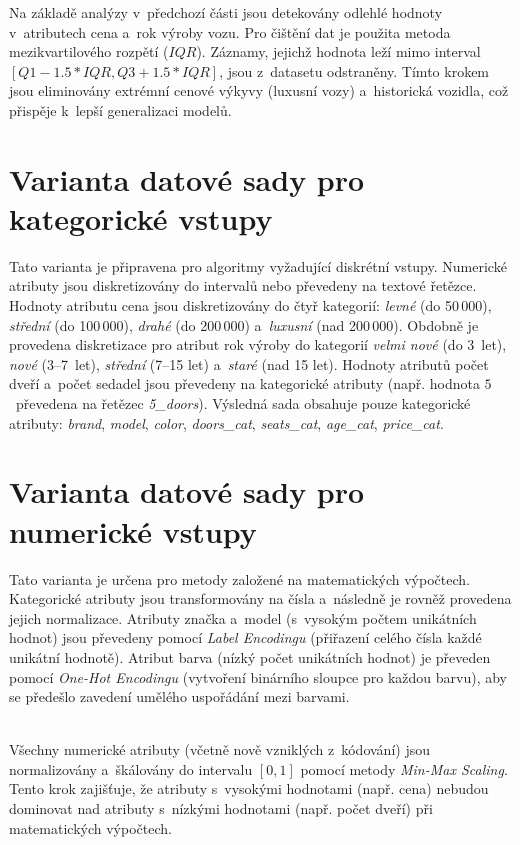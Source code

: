 \documentclass[a4paper, 11pt]{article}
\begin{document}
Na základě analýzy v~předchozí části jsou detekovány odlehlé hodnoty v~atributech cena a~rok výroby vozu.
Pro čištění dat je použita metoda mezikvartilového rozpětí ($IQR$).
Záznamy, jejichž hodnota leží mimo interval $[Q1 - 1.5 \ast IQR, Q3 + 1.5 \ast IQR]$, jsou z~datasetu odstraněny.
Tímto krokem jsou eliminovány extrémní cenové výkyvy (luxusní vozy) a~historická vozidla, což přispěje k~lepší generalizaci modelů.

\section*{Varianta datové sady pro kategorické vstupy}

Tato varianta je připravena pro algoritmy vyžadující diskrétní vstupy.
Numerické atributy jsou diskretizovány do intervalů nebo převedeny na textové řetězce.
Hodnoty atributu cena jsou diskretizovány do čtyř kategorií: \textit{levné} (do 50\,000), \textit{střední} (do 100\,000), \textit{drahé} (do 200\,000) a~\textit{luxusní} (nad 200\,000).
Obdobně je provedena diskretizace pro atribut rok výroby do kategorií \textit{velmi nové} (do 3~let), \textit{nové} (3--7~let), \textit{střední} (7--15 let) a~\textit{staré} (nad 15 let).
Hodnoty atributů počet dveří a~počet sedadel jsou převedeny na kategorické atributy (např. hodnota $5$~převedena na řetězec \textit{5\_doors}).
Výsledná sada obsahuje pouze kategorické atributy: \textit{brand}, \textit{model}, \textit{color}, \textit{doors\_cat}, \textit{seats\_cat}, \textit{age\_cat}, \textit{price\_cat}.

\section*{Varianta datové sady pro numerické vstupy}

Tato varianta je určena pro metody založené na matematických výpočtech.
Kategorické atributy jsou transformovány na čísla a~následně je rovněž provedena jejich normalizace.
Atributy značka a~model (s~vysokým počtem unikátních hodnot) jsou převedeny pomocí \textit{Label Encodingu} (přiřazení celého čísla každé unikátní hodnotě).
Atribut barva (nízký počet unikátních hodnot) je převeden pomocí \textit{One-Hot Encodingu} (vytvoření binárního sloupce pro každou barvu), aby se předešlo zavedení umělého uspořádání mezi barvami.

\noindent \\ Všechny numerické atributy (včetně nově vzniklých z~kódování) jsou normalizovány a~škálovány do intervalu $[0, 1]$ pomocí metody \textit{Min-Max Scaling}.
Tento krok zajišťuje, že atributy s~vysokými hodnotami (např. cena) nebudou dominovat nad atributy s~nízkými hodnotami (např. počet dveří) při matematických výpočtech.
\end{document}
